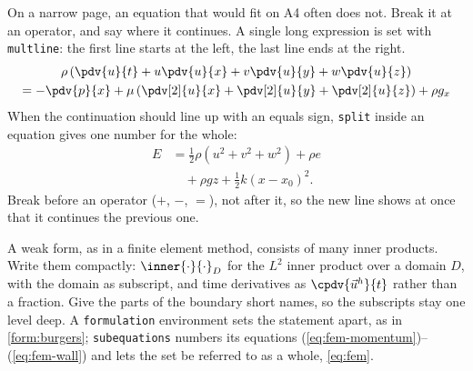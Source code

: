 On a narrow page, an equation that would fit on A4 often does not. Break it at an operator, and say where it continues. A single long expression is set with \texttt{multline}: the first line starts at the left, the last line ends at the right.
\begin{multline}
    \rho \left( \pdv{u}{t} + u \pdv{u}{x} + v \pdv{u}{y} + w \pdv{u}{z} \right) \\
    = -\pdv{p}{x} + \mu \left( \pdv[2]{u}{x} + \pdv[2]{u}{y} + \pdv[2]{u}{z} \right) + \rho g_x
    \label{eq:x-momentum}
\end{multline}
When the continuation should line up with an equals sign, \texttt{split} inside an equation gives one number for the whole:
\begin{equation}
    \begin{split}
        E &= \frac{1}{2} \rho \left( u^2 + v^2 + w^2 \right) + \rho e \\
          &\quad + \rho g z + \frac{1}{2} k \left( x - x_0 \right)^2 .
    \end{split}
    \label{eq:energy}
\end{equation}
Break before an operator ($+$, $-$, $=$), not after it, so the new line shows at once that it continues the previous one.

A weak form, as in a finite element method, consists of many inner products. Write them compactly: $\inner{\cdot}{\cdot}_D$ for the $L^2$ inner product over a domain $D$, with the domain as subscript, and time derivatives as $\cpdv{\vec{u}^h}{t}$ rather than a fraction. Give the parts of the boundary short names, so the subscripts stay one level deep. A \texttt{formulation} environment sets the statement apart, as in \cref{form:burgers}; \texttt{subequations} numbers its equations (\ref{eq:fem-momentum})--(\ref{eq:fem-wall}) and lets the set be referred to as a whole, \cref{eq:fem}.

